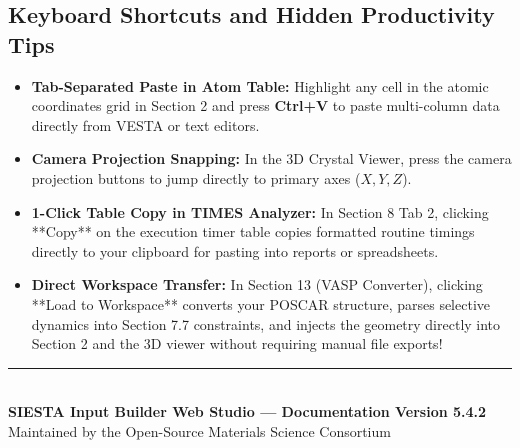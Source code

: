 \documentclass[11pt,a4paper]{article}
\begin{document}
\subsection{Keyboard Shortcuts and Hidden Productivity Tips}
\begin{itemize}[leftmargin=*]
 \item \textbf{Tab-Separated Paste in Atom Table:} Highlight any cell in the atomic coordinates grid in Section 2 and press \textbf{Ctrl+V} to paste multi-column data directly from VESTA or text editors.
 \item \textbf{Camera Projection Snapping:} In the 3D Crystal Viewer, press the camera projection buttons to jump directly to primary axes ($X, Y, Z$).
 \item \textbf{1-Click Table Copy in TIMES Analyzer:} In Section 8 Tab 2, clicking **Copy** on the execution timer table copies formatted routine timings directly to your clipboard for pasting into reports or spreadsheets.
 \item \textbf{Direct Workspace Transfer:} In Section 13 (VASP Converter), clicking **Load to Workspace** converts your POSCAR structure, parses selective dynamics into Section 7.7 constraints, and injects the geometry directly into Section 2 and the 3D viewer without requiring manual file exports!
\end{itemize}

\vspace{1cm}
\begin{center}
\rule{0.6\textwidth}{0.8pt}\\[0.3cm]
\small \textbf{SIESTA Input Builder Web Studio — Documentation Version 5.4.2}\\[0.1cm]
\footnotesize Maintained by the Open-Source Materials Science Consortium
\end{center}
\end{document}
